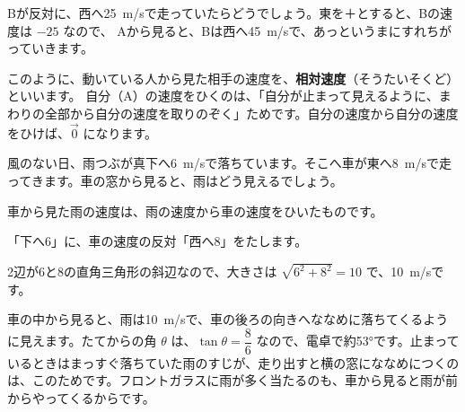 Bが反対に、西へ\qty{25}{m/s}で走っていたらどうでしょう。東を＋とすると、Bの速度は $-25$ なので、
Aから見ると、Bは西へ\qty{45}{m/s}で、あっというまにすれちがっていきます。

このように、動いている人から見た相手の速度を、\textbf{相対速度}（そうたいそくど）といいます。
自分（A）の速度をひくのは、「自分が止まって見えるように、まわりの全部から自分の速度を取りのぞく」ためです。自分の速度から自分の速度をひけば、$\vec{0}$ になります。

風のない日、雨つぶが真下へ\qty{6}{m/s}で落ちています。そこへ車が東へ\qty{8}{m/s}で走ってきます。車の窓から見ると、雨はどう見えるでしょう。

\noindent\begin{minipage}[c]{0.52\linewidth}\centering
{}
\end{minipage}\hfill
\begin{minipage}[c]{0.45\linewidth}\raggedright 
車から見た雨の速度は、雨の速度から車の速度をひいたものです。\par\vspace{2pt}
「下へ6」に、車の速度の反対「西へ8」をたします。\par\vspace{2pt}
2辺が6と8の直角三角形の斜辺なので、大きさは $\sqrt{6^2+8^2}=10$ で、\qty{10}{m/s}です。
\end{minipage}

\par\vspace{4pt}
車の中から見ると、雨は\qty{10}{m/s}で、車の後ろの向きへななめに落ちてくるように見えます。たてからの角 $\theta$ は、$\tan\theta=\dfrac{8}{6}$ なので、電卓で約53°です。止まっているときはまっすぐ落ちていた雨のすじが、走り出すと横の窓にななめにつくのは、このためです。フロントガラスに雨が多く当たるのも、車から見ると雨が前からやってくるからです。

